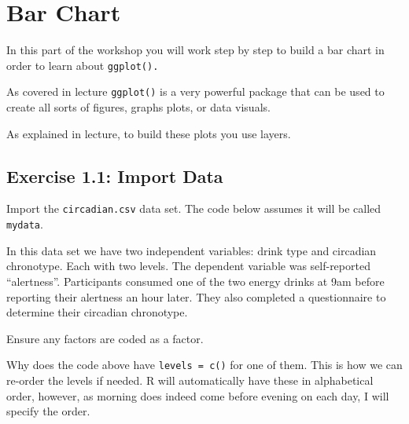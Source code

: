 \documentclass[
]{book}
\newenvironment{Shaded}{\begin{snugshade}}{\end{snugshade}}
\newcommand{\AttributeTok}[1]{\textcolor[rgb]{0.13,0.29,0.53}{#1}}
\newcommand{\CommentTok}[1]{\textcolor[rgb]{0.56,0.35,0.01}{\textit{#1}}}
\newcommand{\FunctionTok}[1]{\textcolor[rgb]{0.13,0.29,0.53}{\textbf{#1}}}
\newcommand{\NormalTok}[1]{#1}
\newcommand{\OtherTok}[1]{\textcolor[rgb]{0.56,0.35,0.01}{#1}}
\newcommand{\SpecialCharTok}[1]{\textcolor[rgb]{0.81,0.36,0.00}{\textbf{#1}}}
\newcommand{\StringTok}[1]{\textcolor[rgb]{0.31,0.60,0.02}{#1}}
\let\oldsection\section
\renewcommand{\section}{\needspace{5\baselineskip}\oldsection}
\let\oldsubsection\subsection
\renewcommand{\subsection}{\needspace{3\baselineskip}\oldsubsection}  %
\begin{document}
\section{Bar Chart}\label{bar-chart}

In this part of the workshop you will work step by step to build a bar chart in order to learn about \texttt{ggplot().}

As covered in lecture \texttt{ggplot()} is a very powerful package that can be used to create all sorts of figures, graphs plots, or data visuals.

As explained in lecture, to build these plots you use layers.

\subsection{Exercise 1.1: Import Data}\label{exercise-1.1-import-data}

Import the \texttt{circadian.csv} data set. The code below assumes it will be called \texttt{mydata}.

In this data set we have two independent variables: drink type and circadian chronotype. Each with two levels. The dependent variable was self-reported ``alertness''. Participants consumed one of the two energy drinks at 9am before reporting their alertness an hour later. They also completed a questionnaire to determine their circadian chronotype.

Ensure any factors are coded as a factor.

\begin{Shaded}
\end{Shaded}

Why does the code above have \texttt{levels\ =\ c()} for one of them. This is how we can re-order the levels if needed. R will automatically have these in alphabetical order, however, as morning does indeed come before evening on each day, I will specify the order.
\end{document}

